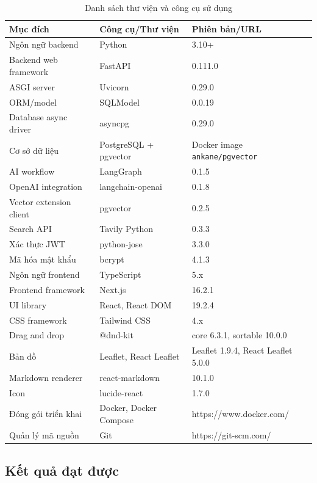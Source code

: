\documentclass[../DoAn.tex]{subfiles}
\begin{document}
\begin{table}[H]
\centering
\begin{tabular}{lll}
\hline
\textbf{Mục đích} & \textbf{Công cụ/Thư viện} & \textbf{Phiên bản/URL} \\ \hline
Ngôn ngữ backend & Python & 3.10+ \\ \hline
Backend web framework & FastAPI & 0.111.0 \\ \hline
ASGI server & Uvicorn & 0.29.0 \\ \hline
ORM/model & SQLModel & 0.0.19 \\ \hline
Database async driver & asyncpg & 0.29.0 \\ \hline
Cơ sở dữ liệu & PostgreSQL + pgvector & Docker image \texttt{ankane/pgvector} \\ \hline
AI workflow & LangGraph & 0.1.5 \\ \hline
OpenAI integration & langchain-openai & 0.1.8 \\ \hline
Vector extension client & pgvector & 0.2.5 \\ \hline
Search API & Tavily Python & 0.3.3 \\ \hline
Xác thực JWT & python-jose & 3.3.0 \\ \hline
Mã hóa mật khẩu & bcrypt & 4.1.3 \\ \hline
Ngôn ngữ frontend & TypeScript & 5.x \\ \hline
Frontend framework & Next.js & 16.2.1 \\ \hline
UI library & React, React DOM & 19.2.4 \\ \hline
CSS framework & Tailwind CSS & 4.x \\ \hline
Drag and drop & @dnd-kit & core 6.3.1, sortable 10.0.0 \\ \hline
Bản đồ & Leaflet, React Leaflet & Leaflet 1.9.4, React Leaflet 5.0.0 \\ \hline
Markdown renderer & react-markdown & 10.1.0 \\ \hline
Icon & lucide-react & 1.7.0 \\ \hline
Đóng gói triển khai & Docker, Docker Compose & https://www.docker.com/ \\ \hline
Quản lý mã nguồn & Git & https://git-scm.com/ \\ \hline
\end{tabular}
\caption{Danh sách thư viện và công cụ sử dụng}
\label{tab:tools-and-libraries}
\end{table}

\subsection{Kết quả đạt được}
\end{document}
